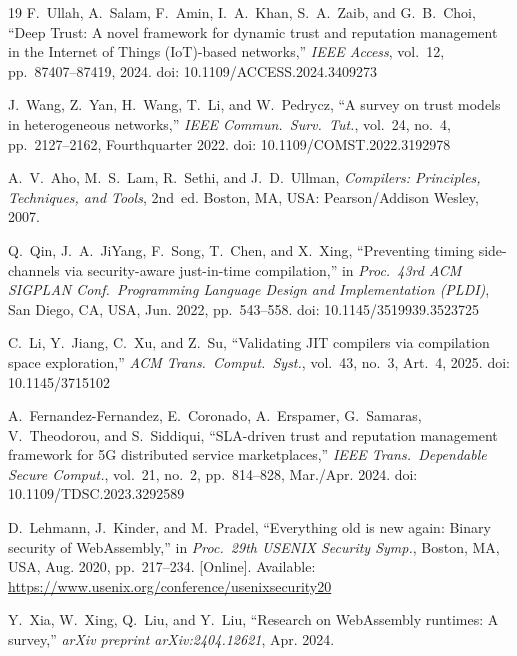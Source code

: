 \documentclass[conference]{IEEEtran}
\begin{document}
\begin{thebibliography}{19}
F.~Ullah, A.~Salam, F.~Amin, I.~A.~Khan, S.~A.~Zaib,
and G.~B.~Choi,
``Deep Trust: A novel framework for dynamic trust and reputation
management in the {Internet of Things (IoT)}-based networks,''
\emph{IEEE Access}, vol.~12, pp.~87407--87419, 2024.
doi: 10.1109/ACCESS.2024.3409273

J.~Wang, Z.~Yan, H.~Wang, T.~Li, and W.~Pedrycz,
``A survey on trust models in heterogeneous networks,''
\emph{IEEE Commun.\ Surv.\ Tut.}, vol.~24, no.~4, pp.~2127--2162,
Fourthquarter 2022.
doi: 10.1109/COMST.2022.3192978

A.~V.~Aho, M.~S.~Lam, R.~Sethi, and J.~D.~Ullman,
\emph{Compilers: Principles, Techniques, and Tools}, 2nd~ed.
Boston, MA, USA: Pearson/Addison Wesley, 2007.

Q.~Qin, J.~A.~JiYang, F.~Song, T.~Chen, and X.~Xing,
``Preventing timing side-channels via security-aware just-in-time
compilation,''
in \emph{Proc.\ 43rd ACM SIGPLAN Conf.\ Programming Language Design
and Implementation (PLDI)}, San Diego, CA, USA, Jun. 2022,
pp.~543--558.
doi: 10.1145/3519939.3523725

C.~Li, Y.~Jiang, C.~Xu, and Z.~Su,
``Validating {JIT} compilers via compilation space exploration,''
\emph{ACM Trans.\ Comput.\ Syst.}, vol.~43, no.~3, Art.~4,
2025.
doi: 10.1145/3715102

A.~Fernandez-Fernandez, E.~Coronado, A.~Erspamer, G.~Samaras,
V.~Theodorou, and S.~Siddiqui,
``{SLA}-driven trust and reputation management framework for {5G}
distributed service marketplaces,''
\emph{IEEE Trans.\ Dependable Secure Comput.}, vol.~21, no.~2,
pp.~814--828, Mar./Apr. 2024.
doi: 10.1109/TDSC.2023.3292589

D.~Lehmann, J.~Kinder, and M.~Pradel,
``Everything old is new again: Binary security of {WebAssembly},''
in \emph{Proc.\ 29th USENIX Security Symp.}, Boston, MA, USA,
Aug. 2020, pp.~217--234.
[Online]. Available: \url{https://www.usenix.org/conference/usenixsecurity20}

Y.~Xia, W.~Xing, Q.~Liu, and Y.~Liu,
``Research on {WebAssembly} runtimes: A survey,''
\emph{arXiv preprint arXiv:2404.12621}, Apr. 2024.


\end{thebibliography}
\end{document}
